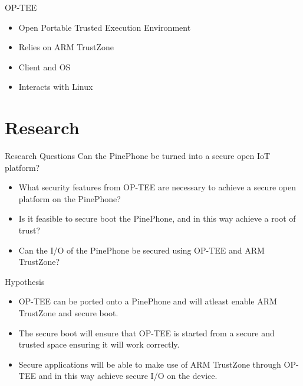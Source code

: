 \documentclass[]{beamer}
\begin{document}
\begin{frame}{OP-TEE}
\begin{itemize}
\item Open Portable Trusted Execution Environment
\item Relies on ARM TrustZone
\item Client and OS
\item Interacts with Linux 

\end{itemize}
\end{frame}

\section{Research}

\begin{frame}{Research Questions}
Can the PinePhone be turned into a secure open IoT platform?
\begin{itemize}
\item What security features from OP-TEE are necessary to achieve a secure open platform on the PinePhone?
\item Is it feasible to secure boot the PinePhone, and in this way achieve a root of trust?
\item Can the I/O of the PinePhone be secured using OP-TEE and ARM TrustZone?
\end{itemize}
\end{frame}

\begin{frame}{Hypothesis}
\begin{itemize}
\item OP-TEE can be ported onto a PinePhone and will atleast enable ARM TrustZone and secure boot.
\item The secure boot will ensure that OP-TEE is started from a secure and trusted space ensuring it will work correctly.
\item Secure applications will be able to make use of ARM TrustZone through OP-TEE and in this way achieve secure I/O on the device.
\end{itemize}
\end{frame}
\end{document}
